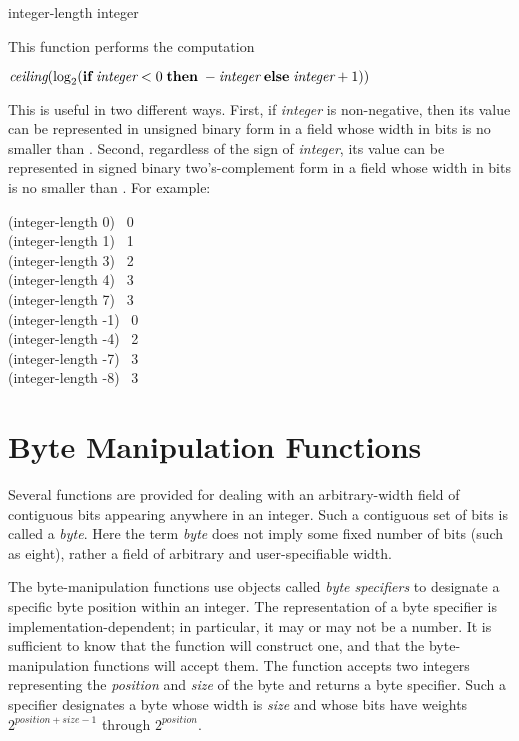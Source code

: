 \begin{defun}[Function]
integer-length integer

This function performs the computation
\begin{tabbing}
$ \emph{ceiling}(\log_2 (\textbf{if}\; \emph{integer} < 0 \;\textbf{then} \;
    -\emph{integer} \;\textbf{else}\; \emph{integer}+1)) $
\end{tabbing}
This is useful in two different ways.
First, if \emph{integer} is non-negative, then its value can be represented
in unsigned binary form in a field whose width in bits is
no smaller than .
Second, regardless of the sign of \emph{integer}, its value can be
represented in signed binary two's-complement form in a field
whose width in bits is no smaller than .
For example:
\begin{lisp}
(integer-length 0) \EV\ 0 \\
(integer-length 1) \EV\ 1 \\
(integer-length 3) \EV\ 2 \\
(integer-length 4) \EV\ 3 \\
(integer-length 7) \EV\ 3 \\
(integer-length -1) \EV\ 0 \\
(integer-length -4) \EV\ 2 \\
(integer-length -7) \EV\ 3 \\
(integer-length -8) \EV\ 3
\end{lisp}
\end{defun}


\section{Byte Manipulation Functions}

Several functions are provided for dealing with an arbitrary-width field of
contiguous bits appearing anywhere in an integer.
Such a contiguous set of bits is called a \emph{byte}.
Here the term \emph{byte} does not imply some fixed number of bits
(such as eight), rather a field of arbitrary and user-specifiable width.

The byte-manipulation functions use objects called \emph{byte specifiers} to
designate a specific byte position within an integer.
The representation of a byte specifier is implementation-dependent;
in particular, it may or may not be a number.
It is sufficient to know that the function  will construct one,
and that the byte-manipulation functions will accept them.
The function  accepts two integers representing
the \emph{position} and \emph{size} of the byte and returns
a byte specifier.
Such a specifier designates a byte whose width is \emph{size}
and whose bits have weights $ 2^{position+size-1} $
through $ 2^{position} $.

